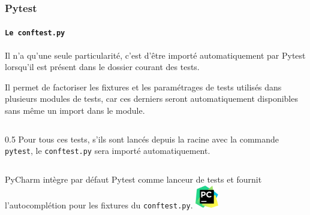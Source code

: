 \documentclass{beamer}
\begin{document}
    \begin{frame}
        \frametitle{Pytest}
        \framesubtitle{\lstinline{Le conftest.py}}
        \transdissolve
        Il n'a qu'une seule particularité, c'est d'être importé automatiquement par Pytest lorsqu'il est présent dans le dossier courant des tests.

        Il permet de factoriser les fixtures et les paramétrages de tests utilisés dans plusieurs modules de tests, car ces derniers seront automatiquement disponibles sans même un import dans le module.
        \begin{columns}
            \column
            {0.5\textwidth}
            Pour tous ces tests, s'ils sont lancés depuis la racine avec la commande \lstinline{pytest}, le \lstinline{conftest.py} sera importé automatiquement.
        \end{columns}
        \bigbreak
        \begin{columns}
            PyCharm intègre par défaut Pytest comme lanceur de tests et fournit l'autocomplétion pour les fixtures du \lstinline{conftest.py}.
            \centering
            \includegraphics[width=1cm]{image/logo-pycharm.png}
        \end{columns}
    \end{frame}
\end{document}
